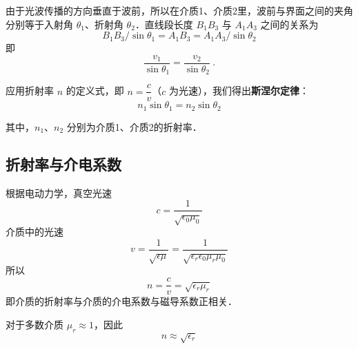 由于光波传播的方向垂直于波前，所以在介质1、介质2里，波前与界面之间的夹角分别等于入射角 $\theta_1$、折射角 $\theta_2$．直线段长度 $B_{1}B_{3}$ 与 $A_{1}A_{3}$ 之间的关系为
\begin{equation}
B_{1}B_{3}/\sin \theta _{1}=A_{1}B_{3}=A_{1}A_{3}/\sin \theta _{2}
\end{equation}
即
\begin{equation}
{\frac  {v_{1}}{\sin \theta _{1}}}={\frac  {v_{2}}{\sin \theta _{2}}}~.
\end{equation}

应用折射率 $n$ 的定义式，即 $n {=}\dfrac{c}{v}$（$c$ 为光速），我们得出\textbf{斯涅尔定律}：
\begin{equation}
n_1\sin\theta_1=n_2\sin\theta_2
\end{equation}

其中，$n_{1}$、$n_{2}$ 分别为介质1、介质2的折射率．

\subsection{折射率与介电系数}
根据电动力学，真空光速 
\begin{equation}
c=\frac{1}{\sqrt{\epsilon_0 \mu_0}}
\end{equation}
介质中的光速 
\begin{equation}
v=\frac{1}{\sqrt{\epsilon\mu}}=\frac{1}{\sqrt{\epsilon_r \epsilon_0 \mu_r \mu_0}}
\end{equation}
所以
\begin{equation}
n=\frac{c}{v}=\sqrt{\epsilon_r \mu_r}
\end{equation}
即介质的折射率与介质的介电系数与磁导系数正相关．\cite{GriffE}

对于多数介质 $\mu_r \approx 1$，因此
\begin{equation}
n \approx \sqrt{\epsilon_r}
\end{equation}
